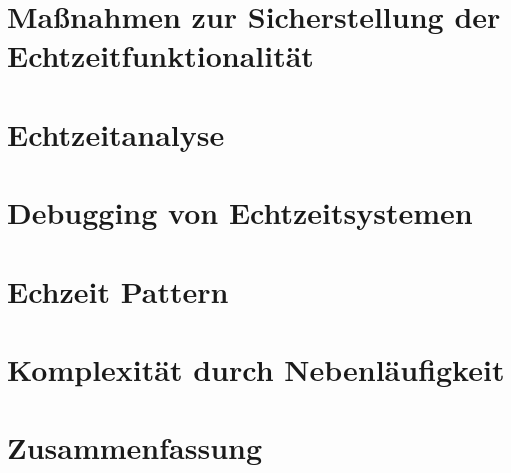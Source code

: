 \documentclass[ngerman]{seminarvorlage}
\begin{document}
\section{Maßnahmen zur Sicherstellung der Echtzeitfunktionalität}
\section{Echtzeitanalyse}
\label{sec:Echtzeitanalyse} 
\section{Debugging von Echtzeitsystemen} 
\section{Echzeit Pattern} 
\section{Komplexität durch Nebenläufigkeit} 
\section{Zusammenfassung}
\pagebreak

\end{document}
